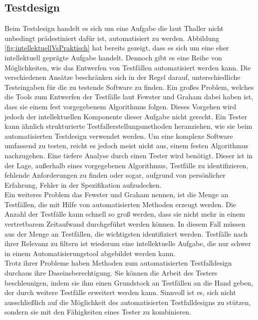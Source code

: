 \subsection{Testdesign}
\label{subsec:testdesign}
Beim Testdesign handelt es sich um eine Aufgabe die laut Thaller \cite[vgl. S. 231]{thaller_software-test_2002} nicht unbedingt prädestiniert dafür ist, automatisiert zu werden. Abbildung \ref{fig:intellektuellVsPraktisch} hat bereits gezeigt, dass es sich um eine eher intellektuell geprägte Aufgabe handelt.
Dennoch gibt es eine Reihe von Möglichkeiten, wie das Entwerfen von Testfällen automatisiert werden kann. Die verschiedenen Ansätze beschränken sich in der Regel darauf, unterschiedliche Testeingaben für die zu testende Software zu finden.
Ein großes Problem, welches die Tools zum Entwerfen der Testfälle laut Fewster und Graham \cite[vgl. S. 19]{fewster_software_1999} dabei haben ist, dass sie einem fest vorgegebenem Algorithmus folgen. Dieses Vorgehen wird jedoch der intellektuellen Komponente dieser Aufgabe nicht gerecht. Ein Tester kann ähnlich strukturierte Testfallerstellungsmethoden heranziehen, wie sie beim automatisierten Testdesign verwendet werden. Um eine komplexe Software umfassend zu testen, reicht es jedoch meist nicht aus, einem festen Algorithmus nachzugehen. Eine tiefere Analyse durch einen Tester wird benötigt. Dieser ist in der Lage, außerhalb eines vorgegebenen Algorithmus, Testfälle zu identifizieren, fehlende Anforderungen zu finden oder sogar, aufgrund von persönlicher Erfahrung, Fehler in der Spezifikation aufzudecken.\\
Ein weiteres Problem das Fewster und Graham \cite[vgl. S. 19]{fewster_software_1999} nennen, ist die Menge an Testfällen, die mit Hilfe von automatisierten Methoden erzeugt werden. Die Anzahl der Testfälle kann schnell so groß werden, dass sie nicht mehr in einem vertretbarem Zeitaufwand durchgeführt werden können. In diesem Fall müssen aus der Menge an Testfällen, die wichtigsten identifiziert werden. Testfälle nach ihrer Relevanz zu filtern ist wiederum eine intellektuelle Aufgabe, die nur schwer in einem Automatisierungstool abgebildet werden kann.\\
Trotz ihrer Probleme haben Methoden zum automatisierten Testfalldesign durchaus ihre Daseinsberechtigung. Sie können die Arbeit des Testers beschleunigen, indem sie ihm einen Grundstock an Testfällen an die Hand geben, der durch weitere Testfälle erweitert werden kann. Sinnvoll ist es, sich nicht ausschließlich auf die Möglichkeit des automatisierten Testfalldesigns zu stützen, sondern sie mit den Fähigkeiten eines Tester zu kombinieren.\\

